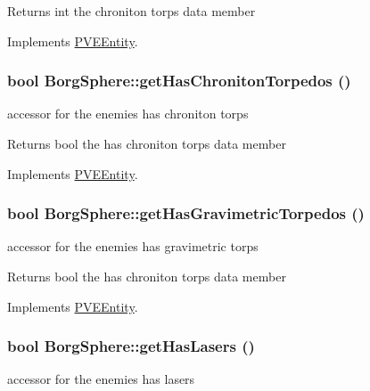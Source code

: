 \begin{DoxyReturn}{Returns}
int the chroniton torps data member 
\end{DoxyReturn}


Implements \hyperlink{classPVEEntity}{PVEEntity}.

\hypertarget{classBorgSphere_a810ef64404ee9a78f8842ef49d998019}{
\subsubsection[{getHasChronitonTorpedos}]{\setlength{\rightskip}{0pt plus 5cm}bool BorgSphere::getHasChronitonTorpedos ()}}
\label{d6/ddd/classBorgSphere_a810ef64404ee9a78f8842ef49d998019}
accessor for the enemies has chroniton torps

\begin{DoxyReturn}{Returns}
bool the has chroniton torps data member 
\end{DoxyReturn}


Implements \hyperlink{classPVEEntity}{PVEEntity}.

\hypertarget{classBorgSphere_a5c829167ede9b93d7712feed42ebc25c}{
\subsubsection[{getHasGravimetricTorpedos}]{\setlength{\rightskip}{0pt plus 5cm}bool BorgSphere::getHasGravimetricTorpedos ()}}
\label{d6/ddd/classBorgSphere_a5c829167ede9b93d7712feed42ebc25c}
accessor for the enemies has gravimetric torps

\begin{DoxyReturn}{Returns}
bool the has chroniton torps data member 
\end{DoxyReturn}


Implements \hyperlink{classPVEEntity}{PVEEntity}.

\hypertarget{classBorgSphere_a1330e8f6c05c6eaf44b601be57d6689a}{
\subsubsection[{getHasLasers}]{\setlength{\rightskip}{0pt plus 5cm}bool BorgSphere::getHasLasers ()}}
\label{d6/ddd/classBorgSphere_a1330e8f6c05c6eaf44b601be57d6689a}
accessor for the enemies has lasers

